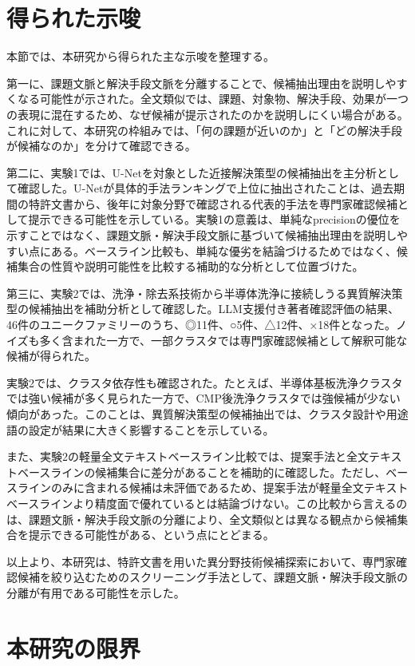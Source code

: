 \section{得られた示唆}

本節では、本研究から得られた主な示唆を整理する。

第一に、課題文脈と解決手段文脈を分離することで、候補抽出理由を説明しやすくなる可能性が示された。全文類似では、課題、対象物、解決手段、効果が一つの表現に混在するため、なぜ候補が提示されたのかを説明しにくい場合がある。これに対して、本研究の枠組みでは、「何の課題が近いのか」と「どの解決手段が候補なのか」を分けて確認できる。

第二に、実験1では、U-Netを対象とした近接解決策型の候補抽出を主分析として確認した。U-Netが具体的手法ランキングで上位に抽出されたことは、過去期間の特許文書から、後年に対象分野で確認される代表的手法を専門家確認候補として提示できる可能性を示している。実験1の意義は、単純なprecisionの優位を示すことではなく、課題文脈・解決手段文脈に基づいて候補抽出理由を説明しやすい点にある。ベースライン比較も、単純な優劣を結論づけるためではなく、候補集合の性質や説明可能性を比較する補助的な分析として位置づけた。

第三に、実験2では、洗浄・除去系技術から半導体洗浄に接続しうる異質解決策型の候補抽出を補助分析として確認した。LLM支援付き著者確認評価の結果、46件のユニークファミリーのうち、◎11件、○5件、△12件、×18件となった。ノイズも多く含まれた一方で、一部クラスタでは専門家確認候補として解釈可能な候補が得られた。

実験2では、クラスタ依存性も確認された。たとえば、半導体基板洗浄クラスタでは強い候補が多く見られた一方で、CMP後洗浄クラスタでは強候補が少ない傾向があった。このことは、異質解決策型の候補抽出では、クラスタ設計や用途語の設定が結果に大きく影響することを示している。

また、実験2の軽量全文テキストベースライン比較では、提案手法と全文テキストベースラインの候補集合に差分があることを補助的に確認した。ただし、ベースラインのみに含まれる候補は未評価であるため、提案手法が軽量全文テキストベースラインより精度面で優れているとは結論づけない。この比較から言えるのは、課題文脈・解決手段文脈の分離により、全文類似とは異なる観点から候補集合を提示できる可能性がある、という点にとどまる。

以上より、本研究は、特許文書を用いた異分野技術候補探索において、専門家確認候補を絞り込むためのスクリーニング手法として、課題文脈・解決手段文脈の分離が有用である可能性を示した。

\section{本研究の限界}

